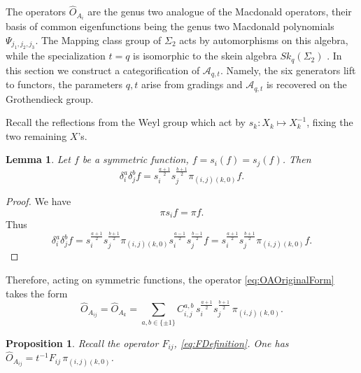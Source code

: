 \documentclass[10pt]{amsart}
\newtheorem{lemma}[theorem]{Lemma}
\newtheorem{proposition}[theorem]{Proposition}
\begin{document}
    The operators $\hat{O}_{A_i}$ are the genus two analogue of the Macdonald operators, their basis of common eigenfunctions being the genus two Macdonald polynomials $\Psi_{j_1,j_2,j_3}$. The Mapping class group of $\Sigma_2$ acts by automorphisms on this algebra\cite{ArthamonovShakirov-2019}, while the specialization $t=q$ is isomorphic to the skein algebra $Sk_q(\Sigma_2)$ \cite{CookeSamuelson-2021}. In this section we construct a categorification of $\mathcal{A}_{q,t}$. Namely, the six generators lift to functors, the parameters $q,t$ arise from gradings and $\mathcal{A}_{q,t}$ is recovered on the Grothendieck group.
	
	Recall the  reflections from the Weyl group which  act by $s_{k}\colon X_{k}\mapsto X_{k}^{-1}$, fixing the two remaining $X$'s.
	
	\begin{lemma}
		Let $f$ be a symmetric function, $f =s_i(f)=s_j(f)$. Then 
		\[\delta_{i}^a \delta_{j}^bf=s_i^{\frac{a+1}{2}}s_j^{\frac{b+1}{2}}\pi_{(i,j)(k,0)}f.\]
	\end{lemma}
    \begin{proof}
	We have
	\[\pi s_i f = \pi f.\]
	Thus 
	\[\delta_{i}^a\delta_{j}^b f=s_i^{\frac{a+1}{2}}s_j^{\frac{b+1}{2}}\pi_{(i,j)(k,0)}s_i^{\frac{a-1}{2}}s_j^{\frac{b-1}{2}}f=s_i^{\frac{a+1}{2}}s_j^{\frac{b+1}{2}}\pi_{(i,j)(k,0)}f.\]
    \end{proof}
	
	Therefore, acting on symmetric functions, the operator \eqref{eq:OAOriginalForm} takes the form
	\begin{equation}\label{eq:OAOriginal}
		\hat O_{A_{ij}}=\hat O_{A_k}=\sum_{a,b\in\{\pm1\}}C^{a,b}_{i,j}\,s_{i}^{\frac{a+1}{2}}s_{j}^{\frac{b+1}{2}}\,\pi_{(i,j)(k,0)}.
	\end{equation}
	
	
	\begin{proposition}\label{prop:OAF}
		Recall the operator $F_{ij}$, \eqref{eq:FDefinition}. One has $\hat O_{A_{ij}}=t^{-1}F_{ij}\,\pi_{(i,j)(k,0)}$.
	\end{proposition}
	
\end{document}
